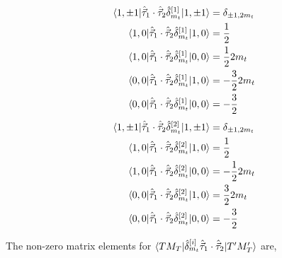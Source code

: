 \documentclass[10pt]{article}
\begin{document}
\begin{multicols}{2}
\noindent
\begin{align*}
	\braket{ 1, \pm 1 | \hat{\vec{\tau}}_{1} \cdot \hat{\vec{\tau}}_{2} \hat{\delta}_{m_t}^{[1]} | 1, \pm 1} &= \delta_{ \pm 1,2m_t}  \\
	\braket{ 1,0 | \hat{\vec{\tau}}_{1} \cdot \hat{\vec{\tau}}_{2} \hat{\delta}_{m_t}^{[1]} | 1,0} &= \frac{1}{2} \\
	\braket{ 1,0 | \hat{\vec{\tau}}_{1} \cdot \hat{\vec{\tau}}_{2} \hat{\delta}_{m_t}^{[1]} | 0,0} &= \frac{1}{2}2m_t \\
	\braket{ 0,0 | \hat{\vec{\tau}}_{1} \cdot \hat{\vec{\tau}}_{2} \hat{\delta}_{m_t}^{[1]} | 1,0} &=-\frac{3}{2}2m_t \\
	\braket{ 0,0 | \hat{\vec{\tau}}_{1} \cdot \hat{\vec{\tau}}_{2} \hat{\delta}_{m_t}^{[1]} | 0,0} &=-\frac{3}{2}
\end{align*}
\begin{align*}
	\braket{ 1, \pm 1 | \hat{\vec{\tau}}_{1} \cdot \hat{\vec{\tau}}_{2} \hat{\delta}_{m_t}^{[2]} | 1, \pm 1} &= \delta_{ \pm 1,2m_t}  \\
	\braket{ 1,0 | \hat{\vec{\tau}}_{1} \cdot \hat{\vec{\tau}}_{2} \hat{\delta}_{m_t}^{[2]} | 1,0} &= \frac{1}{2} \\
	\braket{ 1,0 | \hat{\vec{\tau}}_{1} \cdot \hat{\vec{\tau}}_{2} \hat{\delta}_{m_t}^{[2]} | 0,0} &=-\frac{1}{2}2m_t \\
	\braket{ 0,0 | \hat{\vec{\tau}}_{1} \cdot \hat{\vec{\tau}}_{2} \hat{\delta}_{m_t}^{[2]} | 1,0} &= \frac{3}{2}2m_t \\
	\braket{ 0,0 | \hat{\vec{\tau}}_{1} \cdot \hat{\vec{\tau}}_{2} \hat{\delta}_{m_t}^{[2]} | 0,0} &=-\frac{3}{2}
\end{align*}
\end{multicols}
The non-zero matrix elements for $ \braket{ T M_T |  \hat{\delta}_{m_t}^{[i]} \hat{\vec{\tau}}_{1} \cdot \hat{\vec{\tau}}_{2} | T' M_T'}$ are,
\end{document}
